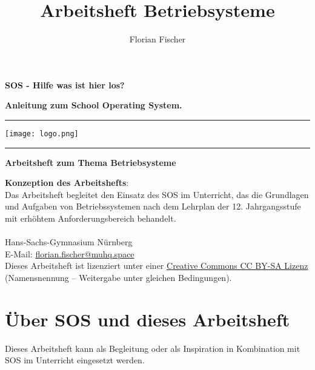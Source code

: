 \documentclass[12pt]{article}
\author{Florian Fischer}
\title{Arbeitsheft Betriebsysteme}
\begin{document}
\pagestyle{empty}
\begin{titlepage}
\setlength\parindent{0pt}
\vspace{3cm}
{\huge \textbf{SOS - Hilfe was ist hier los?}}
\vspace{1.5cm}

{\Large \textbf{Anleitung zum School Operating System.}}
\vspace{1cm}
\hrule
\vspace{1cm}
\begin{centering}
\texttt{[image: logo.png]}
\end{centering}
\hrule
\vspace{1cm}
{\large \textbf{Arbeitsheft zum Thema Betriebsysteme}}

\end{titlepage}

\newpage
\pagestyle{fancy}

\tableofcontents
\vfill{}
{
\onehalfspacing
\setlength\parindent{0pt}
\textbf{\large Konzeption des Arbeitshefts}: \\[0.3cm]

Das Arbeitsheft begleitet den Einsatz des \gls{SOS} im Unterricht, das die Grundlagen und Aufgaben von Betriebssystemen nach dem Lehrplan der 12. Jahrgangsstufe mit erhöhtem Anforderungsbereich behandelt. \\[0.2cm]

\textbf{\theauthor} \\
Hans-Sachs-Gymnasium Nürnberg \\
E-Mail: \href{mailto:florian.fischer@muhq.space}{florian.fischer@muhq.space} \\[0.2cm]

Dieses Arbeitsheft ist lizenziert unter einer \href{https://creativecommons.org/licenses/by-sa/4.0/}{Creative Commons CC BY-SA Lizenz} (Namensnennung – Weitergabe unter gleichen Bedingungen).
}


\newpage
{}

\section*{Über \gls{SOS} und dieses Arbeitsheft}

Dieses Arbeitsheft kann als Begleitung oder als Inspiration in Kombination mit \gls{SOS} im Unterricht eingesetzt werden.
\end{document}
